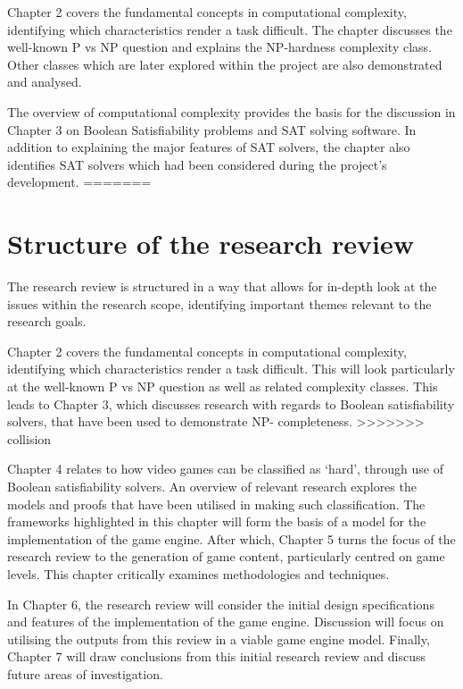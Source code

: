 \documentclass[11pt, a4paper, oneside]{report} %
\begin{document}
Chapter 2 covers the fundamental concepts in computational complexity,
identifying which characteristics render a task difficult. The chapter discusses
the well-known P vs NP question and explains the NP-hardness complexity class.
Other classes which are later explored within the project are also demonstrated
and analysed.

The overview of computational complexity provides the basis for the discussion
in Chapter 3 on Boolean Satisfiability problems and SAT solving software. In
addition to explaining the major features of SAT solvers, the chapter also
identifies SAT solvers which had been considered during the project's
development.
=======
\section{Structure of the research review}

The research review is structured in a way that allows for in-depth look at the
issues within the research scope, identifying important themes relevant to the
research goals.

Chapter 2 covers the fundamental concepts in computational complexity,
identifying which characteristics render a task difficult. This will look
particularly at the well-known P vs NP question as well as related complexity
classes. This leads to Chapter 3, which discusses research with regards to
Boolean satisfiability solvers, that have been used to demonstrate NP-
completeness.
>>>>>>> collision

Chapter 4 relates to how video games can be classified as `hard', through use of
Boolean satisfiability solvers. An overview of relevant research explores the
models and proofs that have been utilised in making such classification. The
frameworks highlighted in this chapter will form the basis of a model for the
implementation of the game engine. After which, Chapter 5 turns the focus of the
research review to the generation of game content, particularly centred on game
levels.  This chapter critically examines methodologies and techniques.

In Chapter 6, the research review will consider the initial design
specifications and features of the implementation of the game engine. Discussion
will focus on utilising the outputs from this review in a viable game engine
model. Finally, Chapter 7 will draw conclusions from this initial research
review and discuss future areas of investigation.

\end{document}
